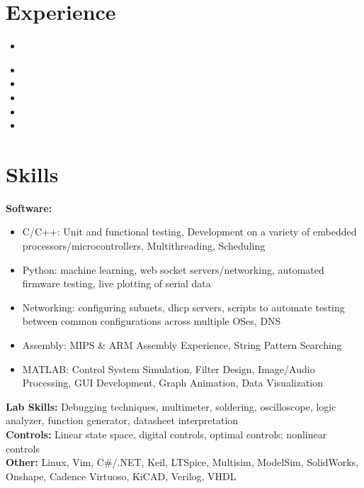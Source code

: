 \documentclass[11pt, a4paper]{article}
\begin{document}
\headerSimple

\section*{Experience}
{\scriptsize

  \workplaceBeam
  \begin{itemize}
    \item \experienceBeamMedium
  \end{itemize}

  \workplaceGTRI
  \begin{itemize}
    \item \experienceGTRIEdgeMLLong
    \item \experienceGTRIFPGA
    \item \experienceGTRIGimbal
    \item \experienceGTRIEmbedded
    \item \experienceGTRIManagement
  \end{itemize}

  \workplaceClappingDetector

  \workplaceEmotionSpeech
  \experienceItemsEmotionSpeechLong

  \workplaceSeniorDesign
  
  \workplaceDDL

  \workplaceMLforT
  
  \workplaceConvexMind

}

\section*{Skills}
{\scriptsize
  \textbf{Software:}
  \begin{itemize}[noitemsep] %
    \item C/C++: Unit and functional testing, Development on a variety of embedded processors/microcontrollers, Multithreading, Scheduling
    \item Python: machine learning, web socket servers/networking, automated firmware testing, live plotting of serial data
    \item Networking: configuring subnets, dhcp servers, scripts to automate testing between common configurations across multiple OSes, DNS
    \item Assembly: MIPS \& ARM Assembly Experience, String Pattern Searching
    \item MATLAB: Control System Simulation, Filter Design, Image/Audio Processing, GUI Development, Graph Animation, Data Visualization
  \end{itemize}
  \textbf{Lab Skills:} Debugging techniques, multimeter, soldering, oscilloscope, logic analyzer, function generator, datasheet interpretation\\
  \textbf{Controls:} Linear state space, digital controls, optimal controls; nonlinear controls\\
  \textbf{Other:} Linux, Vim, C\#/.NET, Keil, LTSpice, Multisim, ModelSim, SolidWorks, Onshape, Cadence Virtuoso, KiCAD, Verilog, VHDL\par\noindent
}
\end{document}
